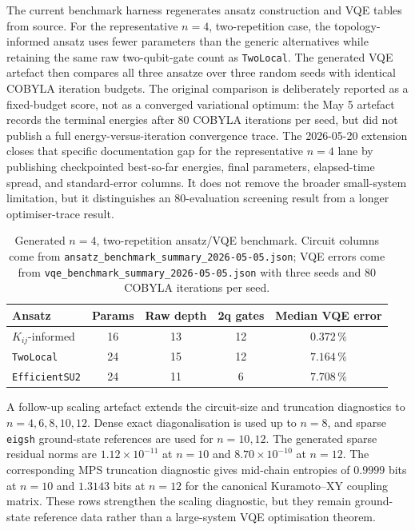 \documentclass[preprint,aps,physrev,superscriptaddress,floatfix,longbibliography]{revtex4-2}
\begin{document}
The current benchmark harness regenerates ansatz construction and VQE
tables from source. For the representative $n=4$, two-repetition case,
the topology-informed ansatz uses fewer parameters than the generic
alternatives while retaining the same raw two-qubit-gate count as
\texttt{TwoLocal}. The generated VQE artefact then compares all three
ansatze over three random seeds with identical COBYLA iteration budgets.
The original comparison is deliberately reported as a fixed-budget score,
not as a converged variational optimum: the May 5 artefact records the
terminal energies after 80 COBYLA iterations per seed, but did not publish
a full energy-versus-iteration convergence trace. The 2026-05-20 extension closes
that specific documentation gap for the representative $n=4$ lane by
publishing checkpointed best-so-far energies, final parameters, elapsed-time
spread, and standard-error columns. It does not remove the broader
small-system limitation, but it distinguishes an 80-evaluation screening
result from a longer optimiser-trace result.

\begin{table}[tb]
\centering
\small
\begin{tabular}{lcccc}
\toprule
Ansatz & Params & Raw depth & 2q gates & Median VQE error \\
\midrule
$K_{ij}$-informed & 16 & 13 & 12 & $0.372\,\%$ \\
\texttt{TwoLocal} & 24 & 15 & 12 & $7.164\,\%$ \\
\texttt{EfficientSU2} & 24 & 11 & 6 & $7.708\,\%$ \\
\bottomrule
\end{tabular}
\caption{Generated $n=4$, two-repetition ansatz/VQE benchmark. Circuit
columns come from
\texttt{ansatz\_benchmark\_summary\_2026-05-05.json};
VQE errors come from
\texttt{vqe\_benchmark\_summary\_2026-05-05.json}
with three seeds and 80 COBYLA iterations per seed.}
\label{tab:ansatz}
\end{table}

A follow-up scaling artefact extends the circuit-size and truncation
diagnostics to $n=4,6,8,10,12$. Dense exact diagonalisation is used up to
$n=8$, and sparse \texttt{eigsh} ground-state references are used for
$n=10,12$. The generated sparse residual norms are
$1.12\times10^{-11}$ at $n=10$ and $8.70\times10^{-10}$ at $n=12$.
The corresponding MPS truncation diagnostic gives mid-chain entropies of
$0.9999$ bits at $n=10$ and $1.3143$ bits at $n=12$ for the canonical
Kuramoto--XY coupling matrix. These rows strengthen the scaling
diagnostic, but they remain ground-state reference data rather than a
large-system VQE optimisation theorem.
\end{document}
